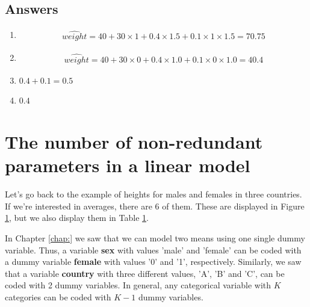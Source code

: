 \documentclass[]{report}\usepackage[]{graphicx}\usepackage[]{color}
\begin{document}
\subsection{Answers}

\begin{enumerate}

\item 
\begin{eqnarray}
\widehat{weight}= 40 + 30 \times 1 + 0.4\times 1.5 + 0.1 \times 1\times 1.5 =70.75 \nonumber
\end{eqnarray}

\item
\begin{eqnarray}
\widehat{weight}= 40 + 30 \times 0 + 0.4\times 1.0 + 0.1 \times 0\times 1.0 =40.4\nonumber
\end{eqnarray}


\item{$0.4 + 0.1 = 0.5$}

\item{$0.4$}


\end{enumerate}

\section{The number of non-redundant parameters in a linear model}

Let's go back to the example of heights for males and females in three countries. If we're interested in averages, there are 6 of them. These are displayed in Figure \ref{}, but we also display them in Table \ref{}.

In Chapter \ref{chap:} we saw that we can model two means using one single dummy variable. Thus, a variable \textbf{sex} with values 'male' and 'female' can be coded with a dummy variable \textbf{female} with values '0' and '1', respectively. Similarly, we saw that a variable \textbf{country} with three different values, 'A', 'B' and 'C', can be coded with 2 dummy variables. In general, any categorical variable with $K$ categories can be coded with $K-1$ dummy variables.

% 
\end{document}
